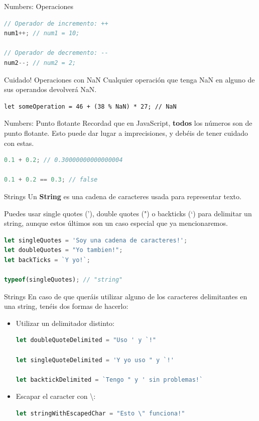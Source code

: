 \documentclass{beamer}
\begin{document}
\begin{frame}[fragile]{Numbers: Operaciones}
\begin{lstlisting}[language=JavaScript]
// Operador de incremento: ++
num1++; // num1 = 10;

// Operador de decremento: --
num2--; // num2 = 2;
\end{lstlisting}

\begin{block}{Cuidado! Operaciones con NaN}
Cualquier operación que tenga NaN en alguno de sus operandos devolverá NaN. 
\begin{lstlisting}
let someOperation = 46 + (38 % NaN) * 27; // NaN
\end{lstlisting}
\end{block}
\end{frame}

\begin{frame}[fragile]{Numbers: Punto flotante}
Recordad que en JavaScript, \textbf{todos} los números son de punto flotante. Esto puede dar lugar a imprecisiones, y debéis de tener cuidado con estas.

\begin{lstlisting}[language=JavaScript]
0.1 + 0.2; // 0.30000000000000004

0.1 + 0.2 == 0.3; // false
\end{lstlisting}
\end{frame}

\begin{frame}[fragile]{Strings}
Un \textbf{String} es una cadena de caracteres usada para representar texto.

Puedes usar single quotes ('), double quotes (") o backticks (`) para delimitar un string, aunque estos últimos son un caso especial que ya mencionaremos.

\begin{lstlisting}[language=JavaScript]
let singleQuotes = 'Soy una cadena de caracteres!';
let doubleQuotes = "Yo tambien!";
let backTicks = `Y yo!`;

typeof(singleQuotes); // "string"
\end{lstlisting}
\end{frame}

\begin{frame}[fragile]{Strings}
En caso de que queráis utilizar alguno de los caracteres delimitantes en una string, tenéis dos formas de hacerlo:
\begin{itemize}
\item Utilizar un delimitador distinto: 
\begin{lstlisting}[language=JavaScript]
let doubleQuoteDelimited = "Uso ' y `!"

let singleQuoteDelimited = 'Y yo uso " y `!'

let backtickDelimited = `Tengo " y ' sin problemas!`
\end{lstlisting}
\item Escapar el caracter con \textbackslash:
\begin{lstlisting}[language=JavaScript]
let stringWithEscapedChar = "Esto \" funciona!"
\end{lstlisting}
\end{itemize}
\end{frame}
\end{document}
